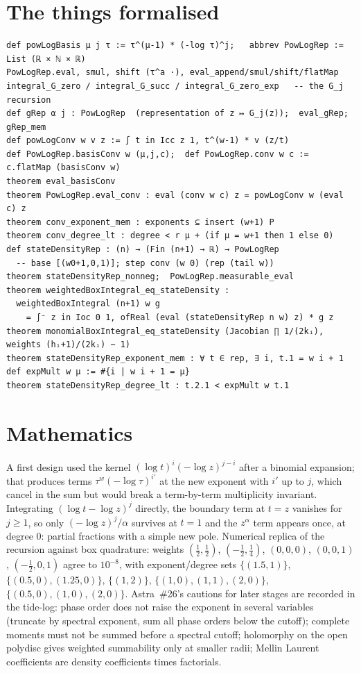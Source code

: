 \documentclass[11pt]{article}
\begin{document}
\section{The things formalised}
{\small
\begin{verbatim}
def powLogBasis μ j τ := τ^(μ-1) * (-log τ)^j;   abbrev PowLogRep := List (ℝ × ℕ × ℝ)
PowLogRep.eval, smul, shift (τ^a ·), eval_append/smul/shift/flatMap
integral_G_zero / integral_G_succ / integral_G_zero_exp   -- the G_j recursion
def gRep α j : PowLogRep  (representation of z ↦ G_j(z));  eval_gRep;  gRep_mem
def powLogConv w v z := ∫ t in Icc z 1, t^(w-1) * v (z/t)
def PowLogRep.basisConv w (μ,j,c);  def PowLogRep.conv w c := c.flatMap (basisConv w)
theorem eval_basisConv
theorem PowLogRep.eval_conv : eval (conv w c) z = powLogConv w (eval c) z
theorem conv_exponent_mem : exponents ⊆ insert (w+1) P
theorem conv_degree_lt : degree < r μ + (if μ = w+1 then 1 else 0)
def stateDensityRep : (n) → (Fin (n+1) → ℝ) → PowLogRep
  -- base [(w0+1,0,1)]; step conv (w 0) (rep (tail w))
theorem stateDensityRep_nonneg;  PowLogRep.measurable_eval
theorem weightedBoxIntegral_eq_stateDensity :
  weightedBoxIntegral (n+1) w g
    = ∫⁻ z in Ioc 0 1, ofReal (eval (stateDensityRep n w) z) * g z
theorem monomialBoxIntegral_eq_stateDensity (Jacobian ∏ 1/(2kᵢ), weights (hᵢ+1)/(2kᵢ) − 1)
theorem stateDensityRep_exponent_mem : ∀ t ∈ rep, ∃ i, t.1 = w i + 1
def expMult w μ := #{i | w i + 1 = μ}
theorem stateDensityRep_degree_lt : t.2.1 < expMult w t.1
\end{verbatim}
}

\section{Mathematics}
A first design used the kernel $(\log t)^i(-\log z)^{j-i}$ after a binomial expansion; that produces
terms $\tau^{w}(-\log\tau)^{i'}$ at the new exponent with $i'$ up to $j$, which cancel in the sum but
would break a term-by-term multiplicity invariant. Integrating $(\log t-\log z)^j$ directly, the
boundary term at $t=z$ vanishes for $j\ge1$, so only $(-\log z)^j/\alpha$ survives at $t=1$ and the
$z^\alpha$ term appears once, at degree $0$: partial fractions with a simple new pole. Numerical
replica of the recursion against box quadrature: weights $(\tfrac12,\tfrac12)$, $(-\tfrac12,\tfrac14)$,
$(0,0,0)$, $(0,0,1)$, $(-\tfrac12,0,1)$ agree to $10^{-8}$, with exponent/degree sets $\{(1.5,1)\}$,
$\{(0.5,0),(1.25,0)\}$, $\{(1,2)\}$, $\{(1,0),(1,1),(2,0)\}$, $\{(0.5,0),(1,0),(2,0)\}$.
Astra~\#26's cautions for later stages are recorded in the tide-log: phase order does not raise the
exponent in several variables (truncate by spectral exponent, sum all phase orders below the cutoff);
complete moments must not be summed before a spectral cutoff; holomorphy on the open polydisc gives
weighted summability only at smaller radii; Mellin Laurent coefficients are density coefficients times
factorials.
\end{document}

